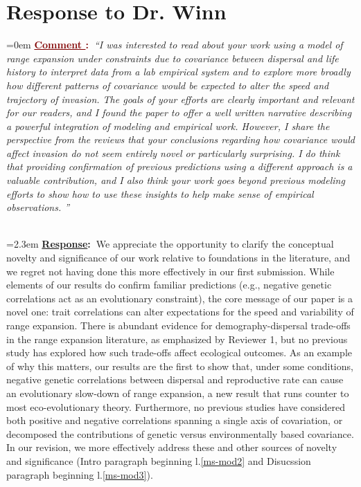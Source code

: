 \documentclass[12pt]{article}
\newcounter{cN}
\newcommand{\comment}[1]{
	\vspace{2em}
	\refstepcounter{cN} %
	\noindent \hangindent=0em \textbf{\textcolor{Maroon}{\uline{Comment \thecN}:~}}\emph{``#1''}
	}
\newcommand{\response}[1]{
	\\[0.25em]
	\hangindent=2.3em \textbf{\textcolor{NavyBlue}{\uline{Response}:~}}#1
	}
\begin{document}
\section{Response to Dr. Winn}
\vspace{-2em}

\comment{I was interested to read about your work using a model of range expansion under constraints due to covariance between dispersal and life history to interpret data from a lab empirical system and to explore more broadly how different patterns of covariance would be expected to alter the speed and trajectory of invasion.
The goals of your efforts are clearly important and relevant for our readers, and I found the paper to offer a well written narrative describing a powerful integration of modeling and empirical work.
However, I share the perspective from the reviews that your conclusions regarding how covariance would affect invasion do not seem entirely novel or particularly surprising.
I do think that providing confirmation of previous predictions using a different approach is a valuable contribution, and I also think your work goes beyond previous modeling efforts to show how to use these insights to help make sense of empirical observations. }
\response{We appreciate the opportunity to clarify the conceptual novelty and significance of our work relative to foundations in the literature, and we regret not having done this more effectively in our first submission.
While elements of our results do confirm familiar predictions (e.g., negative genetic correlations act as an evolutionary constraint), the core message of our paper is a novel one: trait correlations can alter expectations for the speed and variability of range expansion.
There is abundant evidence for demography-dispersal trade-offs in the range expansion literature, as emphasized by Reviewer 1, but no previous study has explored how such trade-offs affect ecological outcomes.
As an example of why this matters, our results are the first to show that, under some conditions, negative genetic correlations between dispersal and reproductive rate can cause an evolutionary slow-down of range expansion, a new result that runs counter to most eco-evolutionary theory.
Furthermore, no previous studies have considered both positive and negative correlations spanning a single axis of covariation, or decomposed the contributions of genetic versus environmentally based covariance.
In our revision, we more effectively address these and other sources of novelty and significance (Intro paragraph beginning l.\ref{ms-mod2} and Disucssion paragraph beginning l.\ref{ms-mod3}).}
\end{document}
